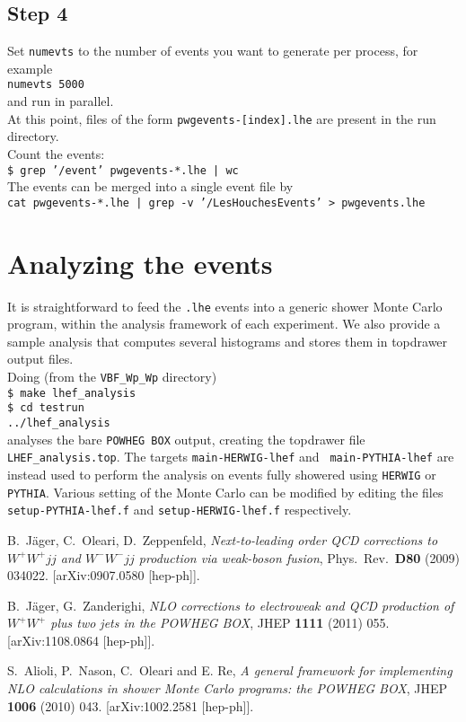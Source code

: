\documentclass[a4paper,11pt]{article}
\begin{document}
\subsection*{Step 4}
%
Set {\tt numevts} to the number of events you want to generate per
process, for example
\\[2ex]
{\tt numevts 5000}
\\[2ex]
and run in parallel.  
\\[2ex]
At this point, files of the form {\tt pwgevents-[index].lhe} are
present in the run directory.
\\[2ex]
Count the events:
\\[2ex]
{\tt \$ grep '/event' pwgevents-*.lhe | wc}
\\[2ex]
The events can be merged into a single event file by
\\[2ex]
{\tt cat pwgevents-*.lhe | grep -v '/LesHouchesEvents' >
  pwgevents.lhe}
%
\section*{Analyzing the events}
%
It is straightforward to feed the {\tt *.lhe} events into a generic
shower Monte Carlo program, within the analysis framework of each
experiment. We also provide a sample analysis that computes several
histograms and stores them in topdrawer output files.
\\[2ex]
Doing (from the {\tt VBF\_Wp\_Wp} directory)
\\[2ex]
{\tt \$ make lhef\_analysis}
\\[2ex]
{\tt \$ cd testrun}
\\[2ex]
{\tt ../lhef\_analysis}
\\[2ex]
analyses the bare {\tt POWHEG BOX} output, creating the topdrawer file
{\tt LHEF\_analysis.top}. The targets {\tt main-HERWIG-lhef} and {\tt
  main-PYTHIA-lhef} are instead used to perform the analysis on events
fully showered using {\tt HERWIG} or {\tt PYTHIA}. Various setting of
the Monte Carlo can be modified by editing the files {\tt
  setup-PYTHIA-lhef.f} and {\tt setup-HERWIG-lhef.f} respectively.
%
%
\begin{thebibliography}{99}
 B.~J\"ager, C.~Oleari, D.~Zeppenfeld, {\em
    Next-to-leading order QCD corrections to $W^+W^+jj$ and $W^-W^-jj$
    production via weak-boson fusion}, Phys.~Rev.~{\bf D80} (2009)
  034022.  [arXiv:0907.0580 [hep-ph]].

 B.~J\"ager, G.~Zanderighi, {\em NLO corrections to
    electroweak and QCD production of $W^+W^+$ plus two jets in the
    POWHEG BOX}, JHEP {\bf 1111} (2011) 055.
  [arXiv:1108.0864 [hep-ph]].
  
 S.~Alioli, P.~Nason, C.~Oleari and E. Re, {\em
    A general framework for implementing NLO calculations in shower
    Monte Carlo programs: the POWHEG BOX}, JHEP {\bf 1006} (2010)
  043.  [arXiv:1002.2581 [hep-ph]].

\end{thebibliography}
\end{document}
